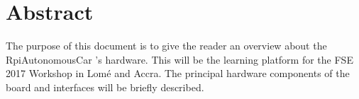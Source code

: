 \documentclass[
12pt, %
a4paper, %
oneside, %
headinclude,footinclude, %
BCOR5mm, %
]{scrartcl}
\title{\normalfont\spacedallcaps{RPi based autonomous Car}} %
\author{\spacedlowsmallcaps{Fullstack Embedded (2017)} \\\spacedlowsmallcaps{Frederic Afadjigla}}
\date{} %
\begin{document}

\renewcommand{\sectionmark}[1]{\markright{\spacedlowsmallcaps{#1}}} %
\lehead{\mbox{\llap{\small\thepage\kern1em\color{halfgray} \vline}\color{halfgray}\hspace{0.5em}\rightmark\hfil}} %

\pagestyle{scrheadings} %

\maketitle %

\setcounter{tocdepth}{2} %

\tableofcontents %
\listoffigures %


\section*{Abstract} %
The purpose of this document is to give the reader an overview about the RpiAutonomousCar 's hardware. This will be the learning platform for the FSE 2017 Workshop in Lomé and Accra. The principal hardware components of the board and interfaces will be briefly described.
\end{document}
